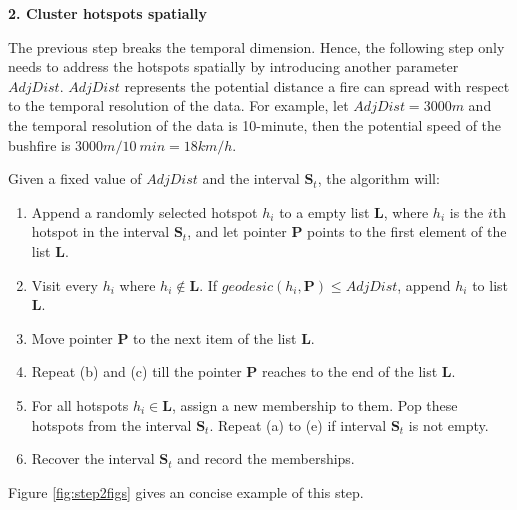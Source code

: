 \textbf{2. Cluster hotspots spatially}

The previous step breaks the temporal dimension. Hence, the following
step only needs to address the hotspots spatially by introducing another
parameter \(AdjDist\). \(AdjDist\) represents the potential distance a
fire can spread with respect to the temporal resolution of the data. For
example, let \(AdjDist = 3000 m\) and the temporal resolution of the
data is 10-minute, then the potential speed of the bushfire is
\(3000m/10~min = 18km/h\).

Given a fixed value of \(AdjDist\) and the interval
\(\boldsymbol{S}_t\), the algorithm will:

\begin{enumerate}
\def\labelenumi{(\alph{enumi})}
\item
  Append a randomly selected hotspot \(h_i\) to a empty list
  \(\boldsymbol{L}\), where \(h_i\) is the \(i\)th hotspot in the
  interval \(\boldsymbol{S}_t\), and let pointer \(\boldsymbol{P}\)
  points to the first element of the list \(\boldsymbol{L}\).
\item
  Visit every \(h_i\) where \(h_i \notin \boldsymbol{L}\). If
  \(geodesic(h_i, \boldsymbol{P})\leq AdjDist\), append \(h_i\) to list
  \(\boldsymbol{L}\).
\item
  Move pointer \(\boldsymbol{P}\) to the next item of the list
  \(\boldsymbol{L}\).
\item
  Repeat (b) and (c) till the pointer \(\boldsymbol{P}\) reaches to the
  end of the list \(\boldsymbol{L}\).
\item
  For all hotspots \(h_i \in \boldsymbol{L}\), assign a new membership
  to them. Pop these hotspots from the interval \(\boldsymbol{S}_t\).
  Repeat (a) to (e) if interval \(\boldsymbol{S}_t\) is not empty.
\item
  Recover the interval \(\boldsymbol{S}_t\) and record the memberships.
\end{enumerate}

Figure \ref{fig:step2figs} gives an concise example of this step.

